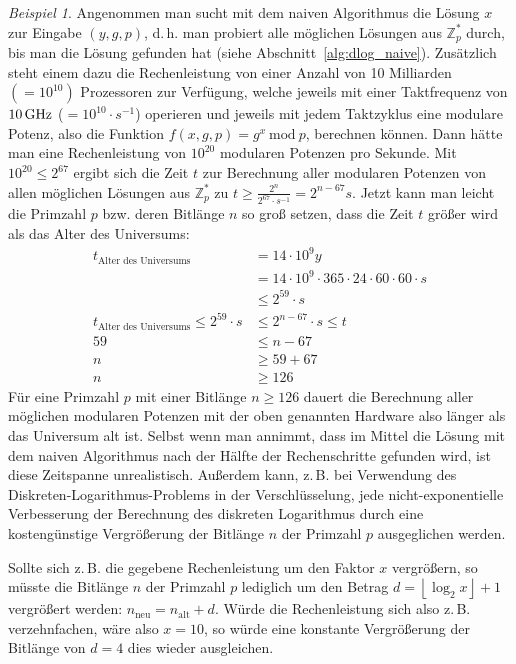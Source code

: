 \documentclass[
  a4paper,
  11pt,
]{scrartcl}
\theoremstyle{plain}
\theoremstyle{definition}
\theoremstyle{remark}
\newtheorem{beispiel}{Beispiel}
\newcommand{\Z}{\mathbb{Z}}
\newcommand{\Mod}[1]{\ \mathrm{mod}\ #1}
\begin{document}
\begin{beispiel}
  Angenommen man sucht mit dem naiven Algorithmus die Lösung $x$ zur Eingabe
  $(y, g, p)$, d.\,h. man probiert alle möglichen Lösungen aus $\Z_p^*$ durch,
  bis man die Lösung gefunden hat (siehe Abschnitt~\ref{alg:dlog_naive}).
  Zusätzlich steht einem dazu die Rechenleistung von einer Anzahl von 10
  Milliarden $(=10^{10})$ Prozessoren zur Verfügung, welche jeweils mit einer
  Taktfrequenz von $10 \text{\,GHz}$ ($= 10^{10} \cdot s^{-1}$) operieren und
  jeweils mit jedem Taktzyklus eine modulare Potenz, also die Funktion $f(x, g,
  p) = g^x \Mod{p}$, berechnen können.
  Dann hätte man eine Rechenleistung von $10^{20}$ modularen Potenzen pro
  Sekunde.
  Mit $10^{20} \leq 2^{67}$ ergibt sich die Zeit $t$ zur Berechnung aller
  modularen Potenzen von allen möglichen Lösungen aus $\Z_p^*$ zu
  $t \geq \frac{2^n}{2^{67}\cdot s^{-1}}=2^{n-67} s$.
  Jetzt kann man leicht die Primzahl $p$ bzw. deren Bitlänge $n$ so groß setzen,
  dass die Zeit $t$ größer wird als das Alter des Universums:
  \begin{align*}
    t_{\text{Alter des Universums}} & = 14 \cdot 10^9 y\\
    & = 14 \cdot 10^9 \cdot 365 \cdot 24 \cdot 60\cdot 60\cdot s\\
    & \leq 2^{59}\cdot s\\
    t_{\text{Alter des Universums}} \leq 2^{59}\cdot s & \leq 2^{n-67}\cdot s \leq t\\
    59 & \leq n-67\\
    n & \geq 59+67\\
    n & \geq 126
  \end{align*}
  Für eine Primzahl $p$ mit einer Bitlänge $n \geq 126$ dauert die Berechnung
  aller möglichen modularen Potenzen mit der oben genannten Hardware also länger
  als das Universum alt ist. Selbst wenn man annimmt, dass im Mittel die Lösung
  mit dem naiven Algorithmus nach der Hälfte der Rechenschritte gefunden wird,
  ist diese Zeitspanne unrealistisch. Außerdem kann, z.\,B. bei Verwendung des
  Diskreten-Logarithmus-Problems in der Verschlüsselung, jede
  nicht-exponentielle Verbesserung der Berechnung des diskreten Logarithmus durch eine kostengünstige Vergrößerung der Bitlänge $n$ der Primzahl $p$ ausgeglichen werden.
  
  Sollte sich z.\,B. die gegebene Rechenleistung um den Faktor $x$ vergrößern, so
  müsste die Bitlänge $n$ der Primzahl $p$ lediglich um den Betrag
  $d = \left\lfloor \log_2 x \right\rfloor + 1$ vergrößert werden:
  $n_{\text{neu}} = n_{\text{alt}} + d$. Würde die Rechenleistung sich also
  z.\,B. verzehnfachen, wäre also $x=10$, so würde eine konstante Vergrößerung
  der Bitlänge von $d=4$ dies wieder ausgleichen.
  

\end{beispiel}
\end{document}
